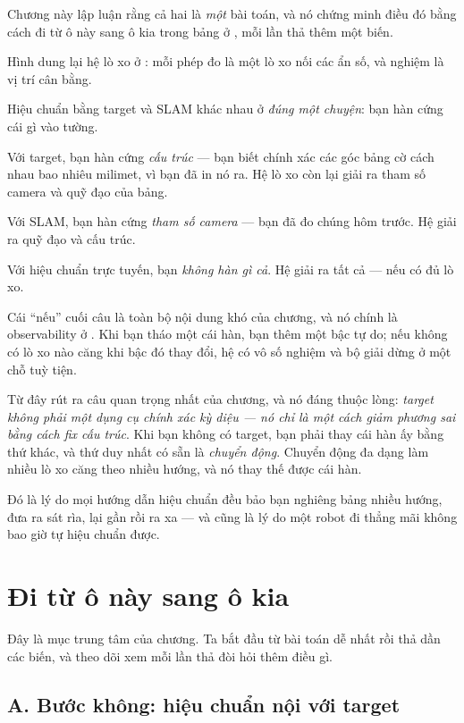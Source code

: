 \documentclass[../../vslam.tex]{subfiles}
\begin{document}
Chương này lập luận rằng cả hai là \emph{một} bài toán, và nó chứng minh điều đó bằng cách đi từ ô này sang ô kia trong bảng ở , mỗi lần thả thêm một biến.

\begin{trucgiac}
Hình dung lại hệ lò xo ở : mỗi phép đo là một lò xo nối các ẩn số, và nghiệm là vị trí cân bằng.

Hiệu chuẩn bằng target và SLAM khác nhau ở \emph{đúng một chuyện}: bạn hàn cứng cái gì vào tường.

Với target, bạn hàn cứng \emph{cấu trúc} --- bạn biết chính xác các góc bảng cờ cách nhau bao nhiêu milimet, vì bạn đã in nó ra. Hệ lò xo còn lại giải ra tham số camera và quỹ đạo của bảng.

Với SLAM, bạn hàn cứng \emph{tham số camera} --- bạn đã đo chúng hôm trước. Hệ giải ra quỹ đạo và cấu trúc.

Với hiệu chuẩn trực tuyến, bạn \emph{không hàn gì cả}. Hệ giải ra tất cả --- nếu có đủ lò xo.

Cái ``nếu'' cuối câu là toàn bộ nội dung khó của chương, và nó chính là observability ở . Khi bạn tháo một cái hàn, bạn thêm một bậc tự do; nếu không có lò xo nào căng khi bậc đó thay đổi, hệ có vô số nghiệm và bộ giải dừng ở một chỗ tuỳ tiện.

Từ đây rút ra câu quan trọng nhất của chương, và nó đáng thuộc lòng: \emph{target không phải một dụng cụ chính xác kỳ diệu --- nó chỉ là một cách giảm phương sai bằng cách fix cấu trúc}. Khi bạn không có target, bạn phải thay cái hàn ấy bằng thứ khác, và thứ duy nhất có sẵn là \emph{chuyển động}. Chuyển động đa dạng làm nhiều lò xo căng theo nhiều hướng, và nó thay thế được cái hàn.

Đó là lý do mọi hướng dẫn hiệu chuẩn đều bảo bạn nghiêng bảng nhiều hướng, đưa ra sát rìa, lại gần rồi ra xa --- và cũng là lý do một robot đi thẳng mãi không bao giờ tự hiệu chuẩn được.
\end{trucgiac}

\section{Đi từ ô này sang ô kia}

Đây là mục trung tâm của chương. Ta bắt đầu từ bài toán dễ nhất rồi thả dần các biến, và theo dõi xem mỗi lần thả đòi hỏi thêm điều gì.

\subsection{A. Bước không: hiệu chuẩn nội với target}
\end{document}
